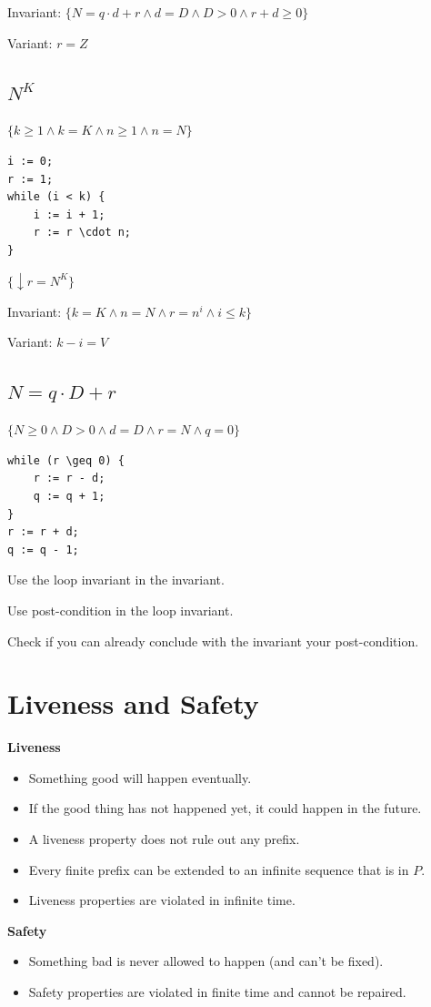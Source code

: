 \documentclass{article}
\begin{document}
Invariant: $\{ N = q \cdot d + r \land d = D \land D > 0 \land r + d \geq 0 \}$

Variant: $r = Z$

\subsection{$N^K$}

$\{ k \geq 1 \land k = K \land n \geq 1 \land n = N \}$

\begin{lstlisting}[style=mystyle, caption=Haskell Code, label=code:haskell]
    i := 0;
r := 1;
while (i < k) {
    i := i + 1;
    r := r \cdot n;
}
\end{lstlisting}

$\{\downarrow r = N^K\}$

Invariant: $\{ k = K \land n = N \land r = n^i \land i \leq k \}$

Variant: $k - i = V$

\subsection{$N = q \cdot D + r$}

$\{ N \geq 0 \land D > 0 \land d = D \land r = N \land q = 0 \}$

\begin{lstlisting}[style=mystyle, caption=Haskell Code, label=code:haskell]
    while (r \geq 0) {
    r := r - d;
    q := q + 1;
}
r := r + d;
q := q - 1;
\end{lstlisting}

Use the loop invariant in the invariant.

Use post-condition in the loop invariant.

Check if you can already conclude with the invariant your post-condition.

\section{Liveness and Safety}

\textbf{Liveness}

\begin{itemize}
    \item Something good will happen eventually.
    \item If the good thing has not happened yet, it could happen in the future.
    \item A liveness property does not rule out any prefix.
    \item Every finite prefix can be extended to an infinite sequence that is in $P$.
    \item Liveness properties are violated in infinite time.
\end{itemize}

\textbf{Safety}

\begin{itemize}
    \item Something bad is never allowed to happen (and can't be fixed).
    \item Safety properties are violated in finite time and cannot be repaired.
\end{itemize}
\end{document}
